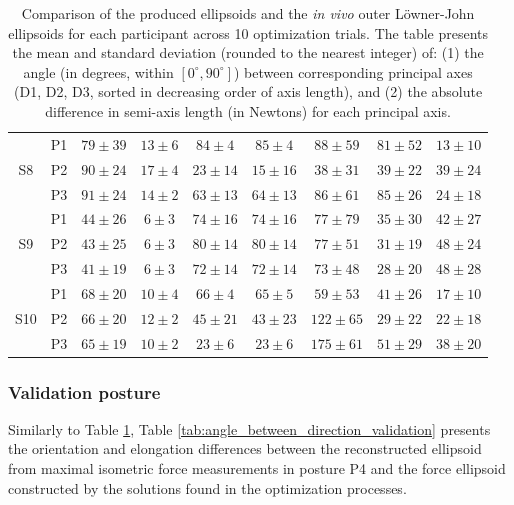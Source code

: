 \begin{table}[!ht]
{\begin{tabular}{|c|c|c||c|c|c||c|c|c|}
    \multirow{3}{*}{S8} & P1 & $79\pm 39$ & $13\pm 6$ & $84\pm 4$ & $85\pm 4$ & $88\pm 59$ & $81\pm 52$ & $13\pm 10$ \\
    & P2 & $90\pm 24$ & $17\pm 4$ & $23\pm 14$ & $15\pm 16$ & $38\pm 31$ & $39\pm 22$ & $39\pm 24$ \\
    & P3 & $91\pm 24$ & $14\pm 2$ & $63\pm 13$ & $64\pm 13$ & $86\pm 61$ & $85\pm 26$ & $24\pm 18$ \\
    \hline
    \hline
    \multirow{3}{*}{S9} & P1 & $44\pm 26$ & $6\pm 3$ & $74\pm 16$ & $74\pm 16$ & $77\pm 79$ & $35\pm 30$ & $42\pm 27$ \\
    & P2 & $43\pm 25$ & $6\pm 3$ & $80\pm 14$ & $80\pm 14$ & $77\pm 51$ & $31\pm 19$ & $48\pm 24$ \\
    & P3 & $41\pm 19$ & $6\pm 3$ & $72\pm 14$ & $72\pm 14$ & $73\pm 48$ & $28\pm 20$ & $48\pm 28$ \\
    \hline
    \hline
    \multirow{3}{*}{S10} & P1 & $68\pm 20$ & $10\pm 4$ & $66\pm 4$ & $65\pm 5$ & $59\pm 53$ & $41\pm 26$ & $17\pm 10$ \\
    & P2 & $66\pm 20$ & $12\pm 2$ & $45\pm 21$ & $43\pm 23$ & $122\pm 65$ & $29\pm 22$ & $22\pm 18$ \\
    & P3 & $65\pm 19$ & $10\pm 2$ & $23\pm 6$ & $23\pm 6$ & $175\pm 61$ & $51\pm 29$ & $38\pm 20$ \\
    \hline
    \end{tabular}}
    \caption{Comparison of the produced ellipsoids and the \emph{in vivo} outer Löwner-John ellipsoids for each participant across 10 optimization trials.  The table presents the mean and standard deviation (rounded to the nearest integer) of: (1) the angle (in degrees, within $[0^\circ, 90^\circ]$) between corresponding principal axes (D1, D2, D3, sorted in decreasing order of axis length), and (2) the absolute difference in semi-axis length (in Newtons) for each principal axis.}
    \label{tab:angle_between_direction}
\end{table}

\subsubsection*{Validation posture}
Similarly to Table \ref{tab:angle_between_direction}, Table \ref{tab:angle_between_direction_validation} presents the orientation and elongation differences between the reconstructed ellipsoid from maximal isometric force measurements in posture P4 and the force ellipsoid constructed by the solutions found in the optimization processes.

